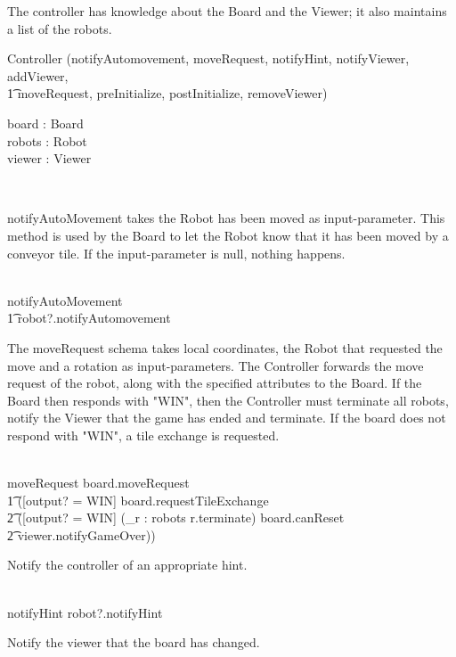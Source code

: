 The controller has knowledge about the Board and the Viewer; it also maintains a list of the robots.
\begin{class}{Controller}
\upharpoonright (notifyAutomovement, moveRequest, notifyHint, notifyViewer, addViewer, \\ \t1 moveRequest, preInitialize, postInitialize, removeViewer) \\
\begin{state}
board : Board \\
robots : \power Robot \\
viewer : Viewer
\end{state}\\
\begin{zpar}
notifyAutoMovement takes the Robot has been moved as input-parameter. This method is used by the Board to let the Robot know that it has been moved by a conveyor tile. If the input-parameter is null, nothing happens.
\end{zpar} \\
notifyAutoMovement  \;\; [] \\\t1 robot?.notifyAutomovement \\
\begin{zpar}
The moveRequest schema takes local coordinates, the Robot that requested the move and a rotation as input-parameters. The Controller forwards the move request of the robot, along with the specified attributes to the Board. If the Board then responds with "WIN", then the Controller must terminate all robots, notify the Viewer that the game has ended and terminate. If the board does not respond with "WIN", a tile exchange is requested.
\end{zpar} \\
moveRequest \sdef board.moveRequest \; \; \comp \\ \t1 ([output? \not = WIN] \wedge board.requestTileExchange \; \; [] \\ \t2 ([output? = WIN] \wedge (\bigwedge_{r : robots} r.terminate) \wedge board.canReset \; \; \wedge \\ \t2 viewer.notifyGameOver)) \\
\begin{zpar}
Notify the controller of an appropriate hint.
\end{zpar} \\
notifyHint \sdef robot?.notifyHint \\
\begin{zpar}
Notify the viewer that the board has changed.
\end{zpar} \\

\end{class}
